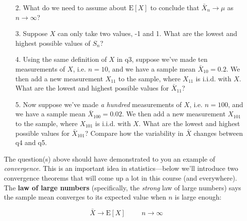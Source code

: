 \documentclass[10pt]{extarticle}
\newcommand{\E}{\text{E}}
\begin{document}
\begin{itemize}
		
	\item[2.] What do we need to assume about $\E[X]$ to conclude that $\bar X_n \rightarrow \mu$ as $n \rightarrow \infty$? \\ 

	\item[3.] Suppose $X$ can only take two values, -1 and 1. What are the lowest and highest possible values of $S_n$? \\ 

	\item[4.] Using the same definition of $X$ in q3, suppose we've made ten measurements of $X$, i.e. $n=10$, and we have a sample mean $\bar X_{10} = 0.2$. We then add a new measurement $X_{11}$ to the sample, where $X_{11}$ is i.i.d. with $X$. What are the lowest and highest possible values for $\bar X_{11}$? \\ 

	\item[5.] Now suppose we've made {\it a hundred} measurements of $X$, i.e. $n=100$, and we have a sample mean $\bar X_{100} = 0.02$. We then add a new measurement $X_{101}$ to the sample, where $X_{101}$ is i.i.d. with $X$. What are the lowest and highest possible values for $\bar X_{101}$? Compare how the variability in $\bar X$ changes between q4 and q5.  

\end{itemize}

\hfill 

The question(s) above should have demonstrated to you an example of {\it convergence}. This is an important idea in statistics---below we'll introduce two convergence theorems that will come up a lot in this course (and everywhere). \\  

The {\bf law of large numbers} (specifically, the {\it strong} law of large numbers) says the sample mean converges to its expected value when $n$ is large enough:  

$$\bar X \longrightarrow \E[X] \hspace{1cm} n \longrightarrow \infty$$ \ 
\end{document}
